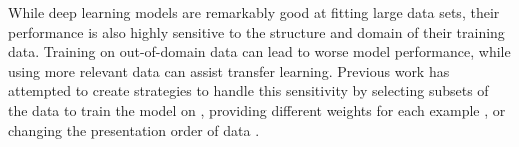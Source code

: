 While deep learning models are remarkably good at fitting large data sets, their performance is also highly sensitive to the structure and domain of their training data. Training on out-of-domain data can lead to worse model performance, while using more relevant data can assist transfer learning.
Previous work has attempted to create strategies to handle this sensitivity by selecting subsets of the data to train the model on \citep{jiang-zhai-2007-instance,wang-etal-2017-instance,axelrod2011domain,moore2010intelligent}, providing different weights for each example \citep{importance_weight,learn_reweight}, or changing the presentation order of data \citep{cl_bengio,rl_nmt}.

